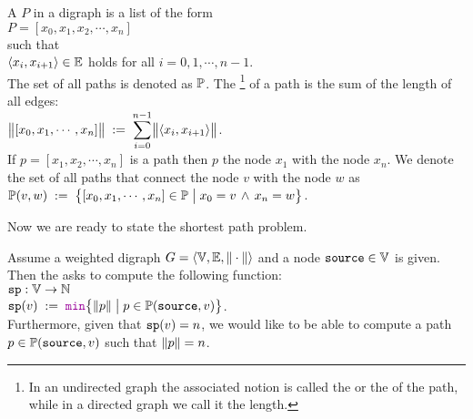 \begin{Definition}
 A  $P$ in a digraph  is a list of the form 
\\[0.2cm]
\hspace*{1.3cm} 
$P = [ x_0, x_1, x_2, \cdots, x_n ]$ 
\\[0.2cm]
such that
\\[0.2cm]
\hspace*{1.3cm} $\pair(x_i,x_{i+1}) \in \edges$ \quad holds for all $i = 0, 1, \cdots, n-1$. 
\\[0.2cm]
The set of all paths is denoted as ${\mathbb P}$.
The \footnote{In an undirected graph the associated notion is called the  or the
   of the path, while in a directed graph we call it the length.} of a path  is the sum of the length of all edges:
\\[0.2cm]
\hspace*{1.3cm}
$\ds\Weight{[x_0,x_1, \cdots, x_n]} \df \sum\limits_{i=0}^{n-1} \Weight{\pair(x_i,x_{i+1})}$. 
\\[0.2cm]
If  $p = [x_1, x_2, \cdots, x_n]$ is a path then  $p$   the node $x_1$ with the node
$x_n$.  We denote the set of all paths that connect the node $v$ with the node $w$ as
\\[0.2cm]
\hspace*{1.3cm} 
 ${\mathbb P}(v,w) \;:=\; \bigl\{ [x_0, x_1, \cdots, x_n] \in {\mathbb P} \bigm| x_0 = v \,\wedge\, x_n = w \bigr\}$.
\end{Definition}

\noindent
Now we are ready to state the shortest path problem.

\begin{Definition} \lb
  Assume a weighted digraph  
  $G = \langle {\mathbb V}, {\mathbb E}, \|\cdot\| \rangle$ 
  and a node $\mbox{\tt source} \in {\mathbb V}$ is given.  Then the  
  asks to compute the following function:
  \\[0.2cm]
  \hspace*{1.3cm} $\mathtt{sp}: {\mathbb V} \rightarrow {\mathbb N}$ \\[0.1cm]
  \hspace*{1.3cm} $\spath(v) \df \mytt{min}\bigl\{ \weight{p} \bigm| p \in \paths(\source,v) \bigr\}$.
  \\[0.2cm]
  Furthermore, given that $\mathtt{sp}(v) = n$, we would like to be able to compute a path 
  $p \in {\mathbb P}(\mbox{\tt source},v)$ such that $\|p\| = n$.
  \eox
\end{Definition}

